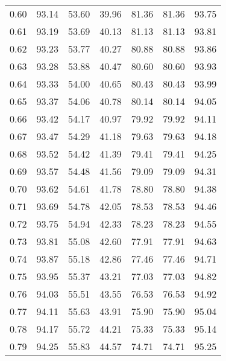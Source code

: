 \begin{tabular}{|c|c|c|c|c|c|c|}
      0.60 &     93.14 &     53.60 &      39.96 &   81.36 &      81.36 &         93.75 \\
      0.61 &     93.19 &     53.69 &      40.13 &   81.13 &      81.13 &         93.81 \\
      0.62 &     93.23 &     53.77 &      40.27 &   80.88 &      80.88 &         93.86 \\
      0.63 &     93.28 &     53.88 &      40.47 &   80.60 &      80.60 &         93.93 \\
      0.64 &     93.33 &     54.00 &      40.65 &   80.43 &      80.43 &         93.99 \\
      0.65 &     93.37 &     54.06 &      40.78 &   80.14 &      80.14 &         94.05 \\
      0.66 &     93.42 &     54.17 &      40.97 &   79.92 &      79.92 &         94.11 \\
      0.67 &     93.47 &     54.29 &      41.18 &   79.63 &      79.63 &         94.18 \\
      0.68 &     93.52 &     54.42 &      41.39 &   79.41 &      79.41 &         94.25 \\
      0.69 &     93.57 &     54.48 &      41.56 &   79.09 &      79.09 &         94.31 \\
      0.70 &     93.62 &     54.61 &      41.78 &   78.80 &      78.80 &         94.38 \\
      0.71 &     93.69 &     54.78 &      42.05 &   78.53 &      78.53 &         94.46 \\
      0.72 &     93.75 &     54.94 &      42.33 &   78.23 &      78.23 &         94.55 \\
      0.73 &     93.81 &     55.08 &      42.60 &   77.91 &      77.91 &         94.63 \\
      0.74 &     93.87 &     55.18 &      42.86 &   77.46 &      77.46 &         94.71 \\
      0.75 &     93.95 &     55.37 &      43.21 &   77.03 &      77.03 &         94.82 \\
      0.76 &     94.03 &     55.51 &      43.55 &   76.53 &      76.53 &         94.92 \\
      0.77 &     94.11 &     55.63 &      43.91 &   75.90 &      75.90 &         95.04 \\
      0.78 &     94.17 &     55.72 &      44.21 &   75.33 &      75.33 &         95.14 \\
      0.79 &     94.25 &     55.83 &      44.57 &   74.71 &      74.71 &         95.25 \\

\end{tabular}
